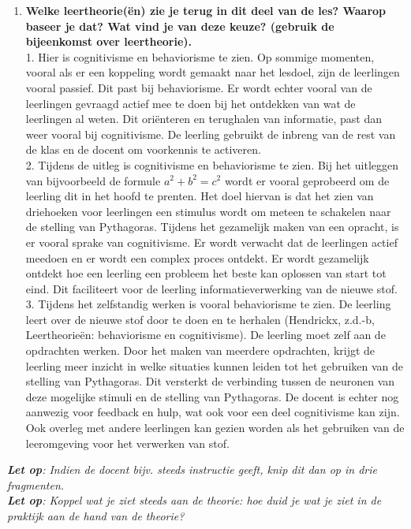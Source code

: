 \documentclass{article}
\begin{document}
\begin{enumerate}[label=(\alph*)]
                \item \textbf{Welke leertheorie(ën) zie je terug in dit deel van de les? Waarop baseer je dat? Wat vind je van deze keuze? (gebruik de bijeenkomst over leertheorie).} \\
                    
                    1. Hier is cognitivisme en behaviorisme te zien. Op sommige momenten, vooral als er een koppeling wordt gemaakt naar het lesdoel, zijn de leerlingen vooral passief. Dit past bij behaviorisme. Er wordt echter vooral van de leerlingen gevraagd actief mee te doen bij het ontdekken van wat de leerlingen al weten. Dit oriënteren en terughalen van informatie, past dan weer vooral bij cognitivisme. De leerling gebruikt de inbreng van de rest van de klas en de docent om voorkennis te activeren.\\
                    
                    2. Tijdens de uitleg is cognitivisme en behaviorisme te zien. Bij het uitleggen van bijvoorbeeld de formule $a^2 + b^2 = c^2$ wordt er vooral geprobeerd om de leerling dit in het hoofd te prenten. Het doel hiervan is dat het zien van driehoeken voor leerlingen een stimulus wordt om meteen te schakelen naar de stelling van Pythagoras. Tijdens het gezamelijk maken van een opracht, is er vooral sprake van cognitivisme. Er wordt verwacht dat de leerlingen actief meedoen en er wordt een complex proces ontdekt. Er wordt gezamelijk ontdekt hoe een leerling een probleem het beste kan oplossen van start tot eind. Dit faciliteert voor de leerling informatieverwerking van de nieuwe stof.\\
                    
                    3. Tijdens het zelfstandig werken is vooral behaviorisme te zien. De leerling leert over de nieuwe stof door te doen en te herhalen (Hendrickx, z.d.-b, Leertheorieën: behaviorisme en cognitivisme). De leerling moet zelf aan de opdrachten werken. Door het maken van meerdere opdrachten, krijgt de leerling meer inzicht in welke situaties kunnen leiden tot het gebruiken van de stelling van Pythagoras. Dit versterkt de verbinding tussen de neuronen van deze mogelijke stimuli en de stelling van Pythagoras. De docent is echter nog aanwezig voor feedback en hulp, wat ook voor een deel cognitivisme kan zijn. Ook overleg met andere leerlingen kan gezien worden als het gebruiken van de leeromgeving voor het verwerken van stof. 
                    
            \end{enumerate}
        \vfil %
        \vfil  %
        \vfil %
        \vfil  %
        \vfil %
        \vfil  %
        \vfil %
        \vfil  %
        \vfil %
        \vfil  %
        \vfil %
        \vfil  %
        \vfil %
        \textit{\textbf{Let op}: Indien de docent bijv. steeds instructie geeft, knip dit dan op in drie fragmenten. \\
        \textbf{Let op}: Koppel wat je ziet steeds aan de theorie: hoe duid je wat je ziet in de praktijk aan de hand van de theorie?}
        \newpage
\end{document}
